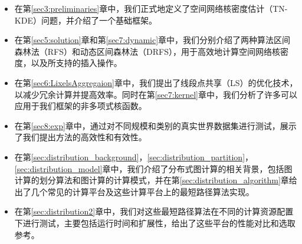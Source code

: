 \begin{itemize}[leftmargin=*]
	\item 在第\ref{sec3:preliminaries}章中，我们正式地定义了空间网络核密度估计（TN-KDE）问题，并介绍了一个基础框架。
	
	\item 在第\ref{sec5:solution}章和第\ref{sec7:dynamic}章中，我们分别介绍了两种算法区间森林法（RFS）和动态区间森林法（DRFS），用于高效地计算空间网络核密度，以及所支持的插入操作。
	
	\item 在第\ref{sec6:LixelsAggregaion}章中，我们提出了线段点共享（LS）的优化技术，以减少冗余计算并提高效率。同时在第\ref{sec7:kernel}章中，我们分析了许多可以应用于我们框架的非多项式核函数。
	
	\item 在第\ref{sec8:exp}章中，通过对不同规模和类别的真实世界数据集进行测试，展示了我们提出方法的高效性和有效性。
	
	\item 在第\ref{sec:distribution_background}，\ref{sec:distribution_partition}，\ref{sec:distribution_model}章中，我们介绍了分布式图计算的相关背景，包括图计算的划分算法和图计算的计算模式，并在第\ref{sec:distribution_algorithm}章给出了几个常见的计算平台及这些计算平台上的最短路径算法实现。
	
	\item 在第\ref{sec:distribution2}章中，我们对这些最短路径算法在不同的计算资源配置下进行测试，主要包括运行时间和扩展性，给出了这些平台的性能对比和选取参考。
\end{itemize}
